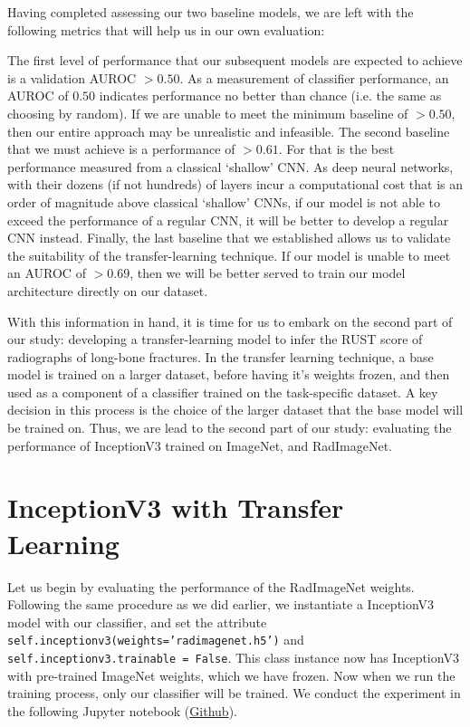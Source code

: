 Having completed assessing our two baseline models, we are left with the following metrics that will help us in our own evaluation:



\noindent
The first level of performance that our subsequent models are expected to achieve is a validation AUROC \(> 0.50\). As a measurement of classifier performance, an AUROC of \(0.50\) indicates performance no better than chance (i.e. the same as choosing by random). If we are unable to meet the minimum baseline of \(> 0.50\), then our entire approach may be unrealistic and infeasible. The second baseline that we must achieve is a performance of \(> 0.61\). For that is the best performance measured from a classical \enquote*{shallow} CNN. As deep neural networks, with their dozens (if not hundreds) of layers incur a computational cost that is an order of magnitude above classical \enquote*{shallow} CNNs, if our model is not able to exceed the performance of a regular CNN, it will be better to develop a regular CNN instead. Finally, the last baseline that we established allows us to validate the suitability of the transfer-learning technique. If our model is unable to meet an AUROC of \(> 0.69\), then we will be better served to train our model architecture directly on our dataset.

With this information in hand, it is time for us to embark on the second part of our study: developing a transfer-learning model to infer the RUST score of radiographs of long-bone fractures. In the transfer learning technique, a base model is trained on a larger dataset, before having it's weights frozen, and then used as a component of a classifier trained on the task-specific dataset. A key decision in this process is the choice of the larger dataset that the base model will be trained on. Thus, we are lead to the second part of our study: evaluating the performance of InceptionV3 trained on ImageNet, and RadImageNet.

\section{InceptionV3 with Transfer Learning}

Let us begin by evaluating the performance of the RadImageNet weights. Following the same procedure as we did earlier, we instantiate a InceptionV3 model with our classifier, and set the attribute \texttt{self.inceptionv3(weights='radimagenet.h5')} and \texttt{self.inceptionv3.trainable = False}. This class instance now has InceptionV3 with pre-trained ImageNet weights, which we have frozen. Now when we run the training process, only our classifier will be trained. We conduct the experiment in the following Jupyter notebook (\href{https://github.com/ShenZhouHong/radiography-ai-project/blob/8d295305fbf9e8a7d1993e4564731e3f3f113f2d/python/initial-evaluation/inceptionv3-radimgnet.ipynb}{Github}).

